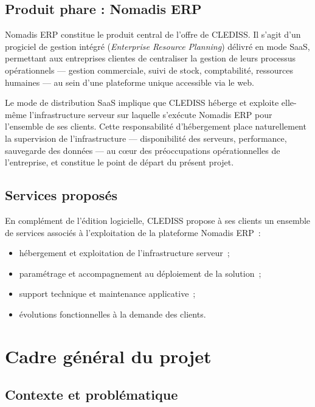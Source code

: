 \subsection{Produit phare : Nomadis ERP}

Nomadis ERP constitue le produit central de l'offre de CLEDISS. Il s'agit d'un progiciel de gestion intégré (\emph{Enterprise Resource Planning}) délivré en mode SaaS, permettant aux entreprises clientes de centraliser la gestion de leurs processus opérationnels — gestion commerciale, suivi de stock, comptabilité, ressources humaines — au sein d'une plateforme unique accessible via le web.

Le mode de distribution SaaS implique que CLEDISS héberge et exploite elle-même l'infrastructure serveur sur laquelle s'exécute Nomadis ERP pour l'ensemble de ses clients. Cette responsabilité d'hébergement place naturellement la supervision de l'infrastructure — disponibilité des serveurs, performance, sauvegarde des données — au cœur des préoccupations opérationnelles de l'entreprise, et constitue le point de départ du présent projet.

\subsection{Services proposés}

En complément de l'édition logicielle, CLEDISS propose à ses clients un ensemble de services associés à l'exploitation de la plateforme Nomadis ERP~:

\begin{itemize}
  \item hébergement et exploitation de l'infrastructure serveur~;
  \item paramétrage et accompagnement au déploiement de la solution~;
  \item support technique et maintenance applicative~;
  \item évolutions fonctionnelles à la demande des clients.
\end{itemize}

\section{Cadre général du projet}

\subsection{Contexte et problématique}

